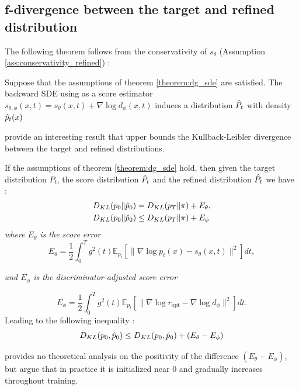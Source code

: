 \subsection{f-divergence between the target and refined distribution}
The following theorem follows from the conservativity of $s_{\theta}$ (Assumption \ref{ass:conservativity_refined}) : 
\begin{theorem}\label{ass:conservativity_refined}
    Suppose that the assumptions of theorem \ref{theorem:dg_sde} are satisfied. The backward SDE using as a score estimator $s_{\theta,\phi}(x,t) = s_{\theta}(x,t) + \nabla \log d_{\phi}(x,t)$ induces a distribution $\Hat{P}_{t}$ with density $\Hat{p}_{t}(x)$
\end{theorem}
\citep{kim2022maximumlikelihoodtrainingimplicit} provide an interesting result that upper bounds the Kullback-Leibler divergence between the target and refined distributions.
\begin{theorem}\label{theorem:kl_refined}\citep{kim2023refininggenerativeprocessdiscriminator}
    If the assumptions of theorem \ref{theorem:dg_sde} hold, then given the target distribution $P_{t}$, the score distribution $\Tilde{P}_{t}$ and the refined distribution $\Hat{P}_t$ we have : 
    \begin{align*}
        D_{KL}(p_{0} \| \Tilde{p}_{0}) &= D_{KL}(p_{T} \| \pi) + E_{\theta}, \\
        D_{KL}(p_{0} \| \Hat{p}_{0}) &\leq D_{KL}(p_{T} \| \pi) + E_{\phi}
    \end{align*}
    \textit{where $E_{\theta}$ is the score error}
    \[
    E_{\theta} = \frac{1}{2} \int_0^T g^2(t) \mathbb{E}_{p_{t}} \left[ \|\nabla \log p_{t}(x) - s_{\theta}(x,t)\|^2 \right] dt,
    \]
    
    \textit{and $E_{\phi}$ is the discriminator-adjusted score error}
    
    \[
    E_{\phi} = \frac{1}{2} \int_0^T g^2(t) \mathbb{E}_{p_{t}} \left[ \|\nabla \log r_{\mathrm{opt}} - \nabla \log d_{\phi}\|^2 \right] dt.
    \]
    Leading to the following inequality : 
    \begin{equation}\label{eq:gain_inequality}
        D_{KL}(p_{0},\Hat{p}_{0}) \leq D_{KL}(p_{0},\Tilde{p}_{0}) + (E_{\theta} - E_{\phi})
    \end{equation}
\end{theorem}
\citep{kim2023refininggenerativeprocessdiscriminator} provides no theoretical analysis on the positivity of the difference $ (E_{\theta} - E_{\phi})$, but argue that in practice it is initialized near 0 and gradually increases throughout training.
